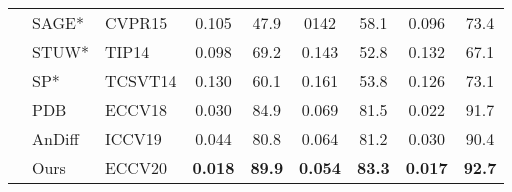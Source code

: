 \documentclass[runningheads]{llncs}
\begin{document}
\begin{table*}[t!]
{\begin{tabular}{c|l|l|cc|cc|cc}
			&SAGE* \cite{video_sage} &CVPR15   &0.105  &47.9 &0142 &58.1  &0.096 &73.4  \\
			&STUW* \cite{video_stuw} &TIP14 &0.098& 69.2 &0.143 &52.8 &0.132 &67.1\\
			&SP*  \cite{video_sp}  &TCSVT14  &0.130  & 60.1  &0.161  &53.8  &0.126  &73.1  \\
			&PDB  \cite{vos_pdb} &ECCV18    &0.030 &84.9   &0.069 &81.5 &0.022 &91.7 \\
			&AnDiff \cite{vos_andiff}&ICCV19  & 0.044 &80.8 &0.064 & 81.2 & 0.030 & 90.4 \\
			\hline
			& Ours &ECCV20  & \textbf{0.018} & \textbf{89.9} & \textbf{0.054} &\textbf{ 83.3} & \textbf{0.017} &\textbf{92.7}\\ 				
			
			\bottomrule
		\end{tabular}
	}	
	
	\label{visal_sota}
\end{table*}
\end{document}
